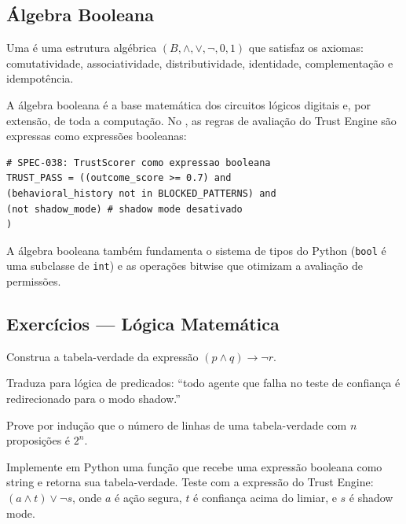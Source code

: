 \subsection{Álgebra Booleana}
\begin{definicao}
Uma  é uma estrutura algébrica
$(B, \land, \lor, \neg, 0, 1)$ que satisfaz os axiomas: comutatividade,
associatividade, distributividade, identidade, complementação e
idempotência.
\end{definicao}
A álgebra booleana é a base matemática dos circuitos lógicos digitais e,
por extensão, de toda a computação. No \opencodeeco{}, as regras de
avaliação do Trust Engine são expressas como expressões booleanas:
\begin{lstlisting}[style=pythonstyle]
# SPEC-038: TrustScorer como expressao booleana
TRUST_PASS = ((outcome_score >= 0.7) and
(behavioral_history not in BLOCKED_PATTERNS) and
(not shadow_mode) # shadow mode desativado
)
\end{lstlisting}
\begin{observacao}
A álgebra booleana também fundamenta o sistema de tipos do Python
(\lstinline{bool} é uma subclasse de \lstinline{int}) e as operações
bitwise que otimizam a avaliação de permissões.
\end{observacao}
\subsection{Exercícios — Lógica Matemática}
\begin{exercicio}[Nivel 0]
Construa a tabela-verdade da expressão $(p \land q) \to \neg r$.
\end{exercicio}
\begin{exercicio}
Traduza para lógica de predicados: ``todo agente que falha no teste de
confiança é redirecionado para o modo shadow.''
\end{exercicio}
\begin{exercicio}
Prove por indução que o número de linhas de uma tabela-verdade com $n$
proposições é $2^n$.
\end{exercicio}
\begin{exercicio}
Implemente em Python uma função que recebe uma expressão booleana como
string e retorna sua tabela-verdade. Teste com a expressão do Trust
Engine: $(a \land t) \lor \neg s$, onde $a$ é ação segura, $t$ é
confiança acima do limiar, e $s$ é shadow mode.
\end{exercicio}
